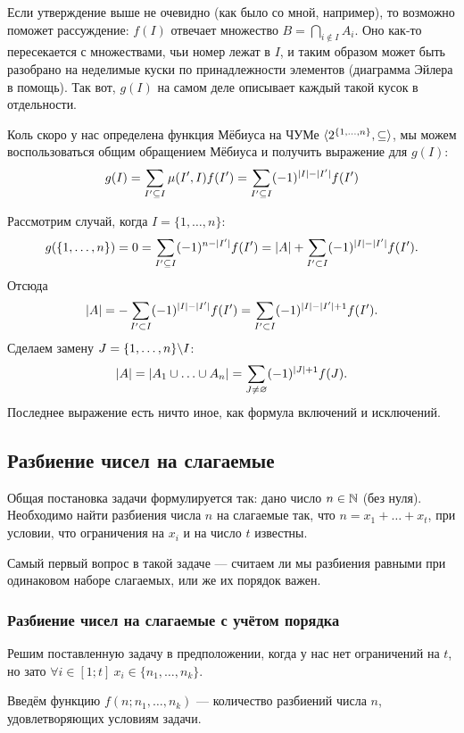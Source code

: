 \begin{anote}
	Если утверждение выше не очевидно (как было со мной, например), то возможно поможет рассуждение:
	$f(I)$ отвечает множество $B = \bigcap\limits_{i \notin I} A_i$. Оно как-то пересекается с множествами, чьи номер лежат в $I$, и таким образом может быть разобрано на неделимые куски по принадлежности элементов (диаграмма Эйлера в помощь). Так вот, $g(I)$ на самом деле описывает каждый такой кусок в отдельности.
\end{anote}

Коль скоро у нас определена функция Мёбиуса на ЧУМе $\langle2^{\{1, \ldots, n\}}, \subseteq\rangle$, мы можем воспользоваться общим обращением Мёбиуса и получить выражение для $g(I)$:
\[
	g(I) = \sum\limits_{I' \subseteq I} \mu(I', I) f(I') = \sum\limits_{I' \subseteq I} (-1)^{|I| - |I'|} f(I')
\]

Рассмотрим случай, когда $I = \{1, \ldots, n\}$:
\[
	g(\{1, \ldots, n\}) = 0 = \sum\limits_{I' \subseteq I} (-1)^{n - |I'|} f(I') = |A| + \sum\limits_{I' \subset I} (-1)^{|I| - |I'|} f(I').
\]
Отсюда
\[
	|A| = -\sum\limits_{I' \subset I} (-1)^{|I| - |I'|} f(I') = \sum\limits_{I' \subset I} (-1)^{|I| - |I'| + 1} f(I').
\]
Сделаем замену $J = \{1, \ldots, n\} \backslash I$:
\[
	|A| = |A_1 \cup \ldots \cup A_n| = \sum\limits_{J \neq \varnothing} (-1)^{|J| + 1} f(J).
\]
Последнее выражение есть ничто иное, как формула включений и исключений.

\subsection{Разбиение чисел на слагаемые}

Общая постановка задачи формулируется так:
дано число $n \in \mathbb{N}$ (без нуля). Необходимо найти разбиения числа $n$ на слагаемые так, что $n = x_1 + \ldots + x_t$, при условии, что ограничения на $x_i$ и на число $t$ известны.

Самый первый вопрос в такой задаче --- считаем ли мы разбиения равными при одинаковом наборе слагаемых, или же их порядок важен.

\subsubsection*{Разбиение чисел на слагаемые с учётом порядка}

Решим поставленную задачу в предположении, когда у нас нет ограничений на $t$, но зато $\forall i \in [1; t]\ x_i \in \{n_1, \ldots, n_k\}$.

Введём функцию $f(n; n_1, \ldots, n_k)$ --- количество разбиений числа $n$, удовлетворяющих условиям задачи.

